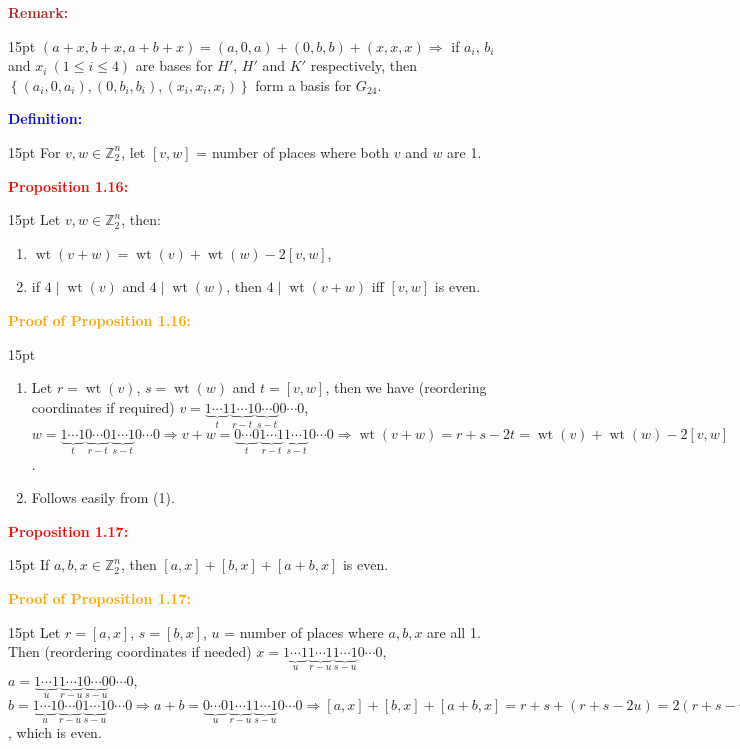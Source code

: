 \documentclass[12pt]{article}
\newcommand{\noparskip}{\vspace{-\parskip}}
\newenvironment{points}
	{\begin{enumerate}[label = (\arabic*)]}
	{\end{enumerate}}
\newenvironment{dent}
	{\begin{adjustwidth}{15pt}{}\noparskip}
	{\end{adjustwidth}}
\newenvironment{result}[1]
	{\textcolor{Red}{\textbf{#1:}}\begin{dent}}
	{\end{dent}}
\newenvironment{proof}[1]
	{\textcolor{Orange}{\textbf{Proof of #1:}}\begin{dent}}
	{\end{dent}}
\newenvironment{definition}
	{\textcolor{Blue}{\textbf{Definition:}}\begin{dent}}
	{\end{dent}}
\newenvironment{remark}
	{\textcolor{Brown}{\textbf{Remark:}}\begin{dent}}
	{\end{dent}}
\renewcommand{\implies}{\Rightarrow}
\newcommand{\set}[1]{\left\{ #1 \right\}}
\newcommand{\Z}{\mathbb{Z}}
\newcommand{\wt}[1]{\operatorname{wt}(#1)}
\begin{document}
\begin{remark}
$(a + x, b + x, a + b + x) = (a, 0, a) + (0, b, b) + (x, x, x) \implies$ if $a_i$, $b_i$ and $x_i\ (1 \le i \le 4)$ are bases for $H'$, $H'$ and $K'$ respectively, then $\set{(a_i, 0, a_i), (0, b_i, b_i), (x_i, x_i, x_i)}$ form a basis for $G_{24}$.
\end{remark}

\begin{definition}
For $v, w \in \Z_2^n$, let $[v, w]$ = number of places where both $v$ and $w$ are 1.
\end{definition}

\begin{result}{Proposition 1.16}
Let $v, w \in \Z_2^n$, then:
\noparskip
\begin{points}
\item $\wt{v + w} = \wt{v} + \wt{w} - 2[v, w]$,
\item if $4 \mid \wt{v}$ and $4 \mid \wt{w}$, then $4 \mid \wt{v + w}$ iff $[v, w]$ is even.
\end{points}
\end{result}

\begin{proof}{Proposition 1.16}
\begin{points}
\item Let $r = \wt{v}$, $s = \wt{w}$ and $t = [v, w]$, then we have (reordering coordinates if required) $v = \underbrace{1 \cdots 1}_t \underbrace{1 \cdots 1}_{r - t} \underbrace{0 \cdots 0}_{s - t} 0 \cdots 0$, $w = \underbrace{1 \cdots 1}_t \underbrace{0 \cdots 0}_{r - t} \underbrace{1 \cdots 1}_{s - t} 0 \cdots 0 \implies v + w = \underbrace{0 \cdots 0}_t \underbrace{1 \cdots 1}_{r - t} \underbrace{1 \cdots 1}_{s - t} 0 \cdots 0 \implies \wt{v + w} = r + s - 2t = \wt{v} + \wt{w} - 2[v, w]$.
\item Follows easily from (1).
\end{points}
\end{proof}

\begin{result}{Proposition 1.17}
If $a, b, x \in \Z_2^n$, then $[a, x] + [b, x] + [a + b, x]$ is even.
\end{result}

\begin{proof}{Proposition 1.17}
Let $r = [a, x]$, $s = [b, x]$, $u$ = number of places where $a, b, x$ are all 1. Then (reordering coordinates if needed) $x = \underbrace{1 \cdots 1}_u \underbrace{1 \cdots 1}_{r - u} \underbrace{1 \cdots 1}_{s - u} 0 \cdots 0$, $a = \underbrace{1 \cdots 1}_u \underbrace{1 \cdots 1}_{r - u} \underbrace{0 \cdots 0}_{s - u} 0 \cdots 0$, $b = \underbrace{1 \cdots 1}_u \underbrace{0 \cdots 0}_{r - u} \underbrace{1 \cdots 1}_{s - u} 0 \cdots 0 \implies a + b = \underbrace{0 \cdots 0}_u \underbrace{1 \cdots 1}_{r - u} \underbrace{1 \cdots 1}_{s - u} 0 \cdots 0 \implies [a, x] + [b, x] + [a + b, x] = r + s + (r + s - 2u) = 2(r + s - u)$, which is even.
\end{proof}
\end{document}
